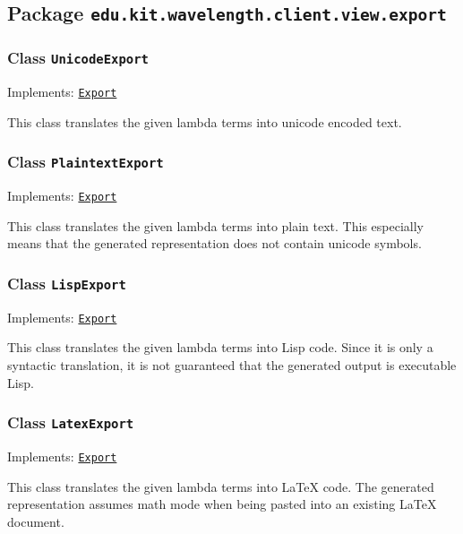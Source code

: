 \subsection{Package \lstinline{edu.kit.wavelength.client.view.export}}
\label{pkg:edu.kit.wavelength.client.view.export}


\subsubsection{Class \texttt{UnicodeExport}}
\label{type:edu.kit.wavelength.client.view.export.UnicodeExport}
Implements: \texttt{\hyperref[type:edu.kit.wavelength.client.view.export.Export]{Export}}

This class translates the given lambda terms into unicode encoded text.

\subsubsection{Class \texttt{PlaintextExport}}
\label{type:edu.kit.wavelength.client.view.export.PlaintextExport}
Implements: \texttt{\hyperref[type:edu.kit.wavelength.client.view.export.Export]{Export}}

This class translates the given lambda terms into plain text. This especially means
 that the generated representation does not contain unicode symbols.

\subsubsection{Class \texttt{LispExport}}
\label{type:edu.kit.wavelength.client.view.export.LispExport}
Implements: \texttt{\hyperref[type:edu.kit.wavelength.client.view.export.Export]{Export}}

This class translates the given lambda terms into Lisp code. Since it is only
 a syntactic translation, it is not guaranteed that the generated output is
 executable Lisp.

\subsubsection{Class \texttt{LatexExport}}
\label{type:edu.kit.wavelength.client.view.export.LatexExport}
Implements: \texttt{\hyperref[type:edu.kit.wavelength.client.view.export.Export]{Export}}

This class translates the given lambda terms into LaTeX code. The generated
 representation assumes math mode when being pasted into an existing LaTeX
 document.

